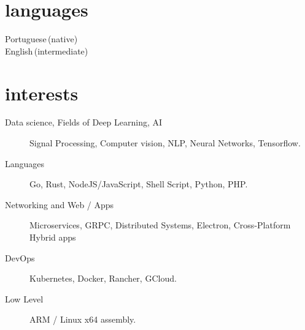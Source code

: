 \documentclass[]{cv-mauri}
\begin{document}
\section*{languages}
\begin{tabularcv}
    Portuguese\,(native) \\
    English\,(intermediate)
\end{tabularcv}

\section*{interests}
	\begin{description}
		\item [Data science, Fields of Deep Learning, AI] Signal Processing, Computer vision, NLP, Neural Networks, Tensorflow.
		\item [Languages] Go, Rust, NodeJS/JavaScript, Shell Script, Python, PHP.
		\item [Networking and Web / Apps] Microservices, GRPC, Distributed Systems, Electron, Cross-Platform Hybrid apps
		\item [DevOps] Kubernetes, Docker, Rancher, GCloud.
		\item [Low Level] ARM / Linux x64 assembly.
	\end{description}
\end{document}
